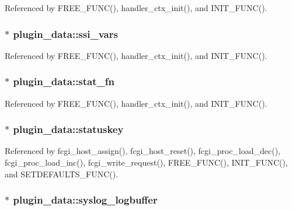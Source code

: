 Referenced by F\-R\-E\-E\-\_\-\-F\-U\-N\-C(), handler\-\_\-ctx\-\_\-init(), and I\-N\-I\-T\-\_\-\-F\-U\-N\-C().

\hypertarget{structplugin__data_a0b99aed15865436263cb5f8f6fc7838e}{
\subsubsection[{ssi\-\_\-vars}]{$\ast$ plugin\-\_\-data\-::ssi\-\_\-vars}}\label{structplugin__data_a0b99aed15865436263cb5f8f6fc7838e}


Referenced by F\-R\-E\-E\-\_\-\-F\-U\-N\-C(), handler\-\_\-ctx\-\_\-init(), and I\-N\-I\-T\-\_\-\-F\-U\-N\-C().

\hypertarget{structplugin__data_af5c7de2d388c6d6bb943db9fd1757ed1}{
\subsubsection[{stat\-\_\-fn}]{$\ast$ plugin\-\_\-data\-::stat\-\_\-fn}}\label{structplugin__data_af5c7de2d388c6d6bb943db9fd1757ed1}


Referenced by F\-R\-E\-E\-\_\-\-F\-U\-N\-C(), handler\-\_\-ctx\-\_\-init(), and I\-N\-I\-T\-\_\-\-F\-U\-N\-C().

\hypertarget{structplugin__data_a7e98bc02877e0b5142082ecdb6e6b41c}{
\subsubsection[{statuskey}]{$\ast$ plugin\-\_\-data\-::statuskey}}\label{structplugin__data_a7e98bc02877e0b5142082ecdb6e6b41c}


Referenced by fcgi\-\_\-host\-\_\-assign(), fcgi\-\_\-host\-\_\-reset(), fcgi\-\_\-proc\-\_\-load\-\_\-dec(), fcgi\-\_\-proc\-\_\-load\-\_\-inc(), fcgi\-\_\-write\-\_\-request(), F\-R\-E\-E\-\_\-\-F\-U\-N\-C(), I\-N\-I\-T\-\_\-\-F\-U\-N\-C(), and S\-E\-T\-D\-E\-F\-A\-U\-L\-T\-S\-\_\-\-F\-U\-N\-C().

\hypertarget{structplugin__data_a0ac2c3c2828f52d293c559d0ce072e86}{
\subsubsection[{syslog\-\_\-logbuffer}]{$\ast$ plugin\-\_\-data\-::syslog\-\_\-logbuffer}}\label{structplugin__data_a0ac2c3c2828f52d293c559d0ce072e86}


